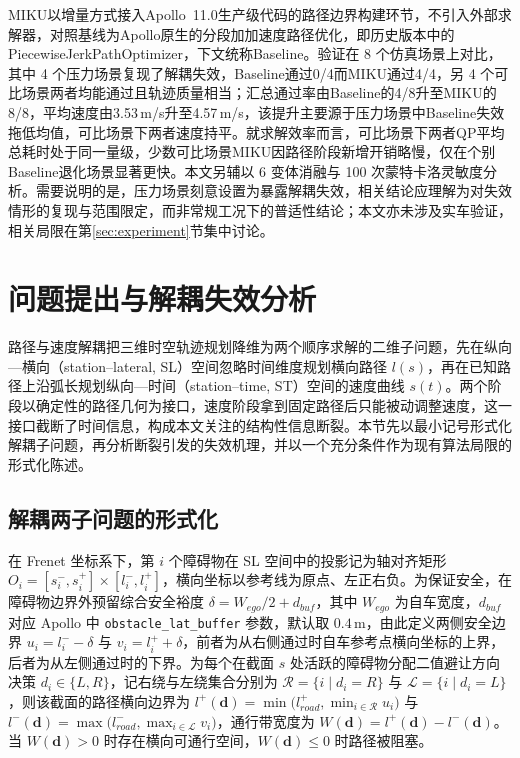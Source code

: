 \documentclass[a4paper,zihao=5]{ctexart}
\theoremstyle{definition}
\begin{document}
MIKU以增量方式接入Apollo~11.0生产级代码的路径边界构建环节，不引入外部求解器，对照基线为Apollo原生的分段加加速度路径优化，即历史版本中的PiecewiseJerkPathOptimizer，下文统称Baseline。验证在 8 个仿真场景上对比，其中 4 个压力场景复现了解耦失效，Baseline通过0/4而MIKU通过4/4，另 4 个可比场景两者均能通过且轨迹质量相当；汇总通过率由Baseline的4/8升至MIKU的8/8，平均速度由3.53\,m/s升至4.57\,m/s，该提升主要源于压力场景中Baseline失效拖低均值，可比场景下两者速度持平。就求解效率而言，可比场景下两者QP平均总耗时处于同一量级，少数可比场景MIKU因路径阶段新增开销略慢，仅在个别Baseline退化场景显著更快。本文另辅以 6 变体消融与 100 次蒙特卡洛灵敏度分析。需要说明的是，压力场景刻意设置为暴露解耦失效，相关结论应理解为对失效情形的复现与范围限定，而非常规工况下的普适性结论；本文亦未涉及实车验证，相关局限在第\ref{sec:experiment}节集中讨论。

\section{问题提出与解耦失效分析}
\label{sec:problem}

路径与速度解耦把三维时空轨迹规划降维为两个顺序求解的二维子问题，先在纵向—横向（station--lateral, SL）空间忽略时间维度规划横向路径 $l(s)$，再在已知路径上沿弧长规划纵向—时间（station--time, ST）空间的速度曲线 $s(t)$。两个阶段以确定性的路径几何为接口，速度阶段拿到固定路径后只能被动调整速度，这一接口截断了时间信息，构成本文关注的结构性信息断裂。本节先以最小记号形式化解耦子问题，再分析断裂引发的失效机理，并以一个充分条件作为现有算法局限的形式化陈述。

\subsection{解耦两子问题的形式化}
\label{subsec:decouple_formalize}

在 Frenet 坐标系下，第 $i$ 个障碍物在 SL 空间中的投影记为轴对齐矩形 $O_i = [s_i^{-}, s_i^{+}] \times [l_i^{-}, l_i^{+}]$，横向坐标以参考线为原点、左正右负。为保证安全，在障碍物边界外预留综合安全裕度 $\delta = W_{ego}/2 + d_{buf}$，其中 $W_{ego}$ 为自车宽度，$d_{buf}$ 对应 Apollo 中 \texttt{obstacle\_lat\_buffer} 参数，默认取 $0.4\,\mathrm{m}$，由此定义两侧安全边界 $u_i = l_i^{-} - \delta$ 与 $v_i = l_i^{+} + \delta$，前者为从右侧通过时自车参考点横向坐标的上界，后者为从左侧通过时的下界。为每个在截面 $s$ 处活跃的障碍物分配二值避让方向决策 $d_i \in \{L, R\}$，记右绕与左绕集合分别为 $\mathcal{R} = \{i \mid d_i = R\}$ 与 $\mathcal{L} = \{i \mid d_i = L\}$，则该截面的路径横向边界为 $l^{+}(\mathbf{d}) = \min\big(l_{road}^{+}, \min_{i \in \mathcal{R}} u_i\big)$ 与 $l^{-}(\mathbf{d}) = \max\big(l_{road}^{-}, \max_{i \in \mathcal{L}} v_i\big)$，通行带宽度为 $W(\mathbf{d}) = l^{+}(\mathbf{d}) - l^{-}(\mathbf{d})$。当 $W(\mathbf{d}) > 0$ 时存在横向可通行空间，$W(\mathbf{d}) \le 0$ 时路径被阻塞。
\end{document}
